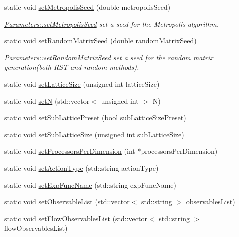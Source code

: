 \begin{DoxyCompactItemize}
static void \mbox{\hyperlink{class_parameters_ace3967a0ee49901f55e9de69e0a96117}{set\+Metropolis\+Seed}} (double metropolis\+Seed)
\begin{DoxyCompactList}\small\item\em \mbox{\hyperlink{class_parameters_ace3967a0ee49901f55e9de69e0a96117}{Parameters\+::set\+Metropolis\+Seed}} set a seed for the Metropolis algorithm. \end{DoxyCompactList}\item 
static void \mbox{\hyperlink{class_parameters_a46615f8286bd7363ab1f09074fdc6940}{set\+Random\+Matrix\+Seed}} (double random\+Matrix\+Seed)
\begin{DoxyCompactList}\small\item\em \mbox{\hyperlink{class_parameters_a46615f8286bd7363ab1f09074fdc6940}{Parameters\+::set\+Random\+Matrix\+Seed}} set a seed for the random matrix generation(both R\+S\+T and random methods). \end{DoxyCompactList}\item 
static void \mbox{\hyperlink{class_parameters_a5ed3d5d9a08ceecbd3378da54e717794}{set\+Lattice\+Size}} (unsigned int lattice\+Size)
\item 
static void \mbox{\hyperlink{class_parameters_a0e0118ebbe8f19148a5c6d737c7a2c85}{setN}} (std\+::vector$<$ unsigned int $>$ N)
\item 
static void \mbox{\hyperlink{class_parameters_a95d3c7f35ed0421419d98faecb2c23e8}{set\+Sub\+Lattice\+Preset}} (bool sub\+Lattice\+Size\+Preset)
\item 
static void \mbox{\hyperlink{class_parameters_a978f5547036311816f21e3ebe8af77fc}{set\+Sub\+Lattice\+Size}} (unsigned int sub\+Lattice\+Size)
\item 
static void \mbox{\hyperlink{class_parameters_a4c983b1ab17ec51be118792b3a6d17a5}{set\+Processors\+Per\+Dimension}} (int $\ast$processors\+Per\+Dimension)
\item 
static void \mbox{\hyperlink{class_parameters_aa7436b658d07358009b922584798fb6d}{set\+Action\+Type}} (std\+::string action\+Type)
\item 
static void \mbox{\hyperlink{class_parameters_abbcb8f09dfec507ec29caa248819522b}{set\+Exp\+Func\+Name}} (std\+::string exp\+Func\+Name)
\item 
static void \mbox{\hyperlink{class_parameters_a6fb3ff88b2a2c9d5d4f2c3b64e672fa1}{set\+Observable\+List}} (std\+::vector$<$ std\+::string $>$ observables\+List)
\item 
static void \mbox{\hyperlink{class_parameters_ad7a6cb2ff449a75c13df52c786da7b98}{set\+Flow\+Observables\+List}} (std\+::vector$<$ std\+::string $>$ flow\+Observables\+List)

\end{DoxyCompactItemize}
